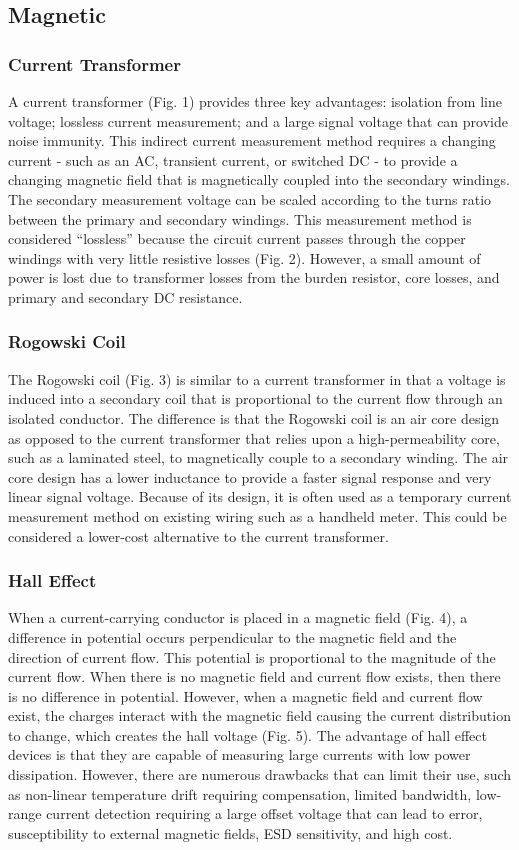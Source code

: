 \documentclass[12pt,a4paper,titlepage,openany]{report}
\begin{document}
\subsection{Magnetic}
\subsubsection{Current Transformer}
A current transformer (Fig. 1) provides three key advantages: isolation from line voltage; lossless current measurement; and a
large signal voltage that can provide noise immunity. This indirect current measurement method requires a changing current -
such as an AC, transient current, or switched DC - to provide a changing magnetic field that is magnetically coupled into the
secondary windings. The secondary measurement voltage can be scaled according to the turns ratio between the primary and
secondary windings. This measurement method is considered “lossless” because the circuit current passes through the copper
windings with very little resistive losses (Fig. 2). However, a small amount of power is lost due to transformer losses from the
burden resistor, core losses, and primary and secondary DC resistance.

\subsubsection{Rogowski Coil}
The Rogowski coil (Fig. 3) is similar to a current transformer in that a voltage is induced into a secondary coil that is proportional
to the current flow through an isolated conductor. The difference is that the Rogowski coil is an air core design as opposed to
the current transformer that relies upon a high-permeability core, such as a laminated steel, to magnetically couple to a
secondary winding. The air core design has a lower inductance to provide a faster signal response and very linear signal voltage.
Because of its design, it is often used as a temporary current measurement method on existing wiring such as a handheld meter.
This could be considered a lower-cost alternative to the current transformer.

\subsubsection{Hall Effect}
When a current-carrying conductor is placed in a magnetic field (Fig. 4), a difference in potential occurs perpendicular to the
magnetic field and the direction of current flow. This potential is proportional to the magnitude of the current flow. When there
is no magnetic field and current flow exists, then there is no difference in potential. However, when a magnetic field and current
flow exist, the charges interact with the magnetic field causing the current distribution to change, which creates the hall voltage
(Fig. 5).
The advantage of hall effect devices is that they are capable of measuring large currents with low power dissipation. However,
there are numerous drawbacks that can limit their use, such as non-linear temperature drift requiring compensation, limited
bandwidth, low-range current detection requiring a large offset voltage that can lead to error, susceptibility to external magnetic
fields, ESD sensitivity, and high cost.
\end{document}
